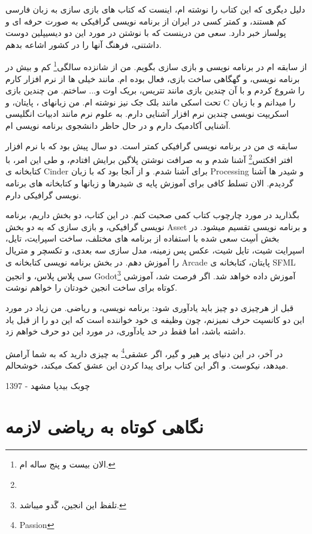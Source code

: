 \documentclass[14pt,a4paper]{memoir}
\begin{document}
	دلیل دیگری که این کتاب را نوشته ام، اینست که کتاب های بازی سازی به زبان فارسی کم هستند، و کمتر کسی در ایران از برنامه نویسی گرافیکی به صورت حرفه ای و پولساز خبر دارد. سعی من درینست که با نوشتن در مورد این دو دیسیپلین دوست داشتنی، فرهنگ آنها را در کشور اشاعه بدهم.
	
	از سابقه ام در برنامه نویسی و بازی سازی بگویم. من از شانزده سالگی\footnote{الان بیست و پنج ساله ام.} کم و بیش در برنامه نویسی، و گهگاهی ساخت بازی، فعال بوده ام. مانند خیلی ها از نرم افزار  کارم را شروع کردم و با آن چندین بازی مانند تتریس، بریک اوت و... ساختم. من چندین بازی تحت اسکی مانند بلک جک نیز نوشته ام. من زبانهای ، پایتان، و C را میدانم و با زبان اسکریپت نویسی چندین نرم افزار آشنایی دارم. به علوم نرم مانند ادبیات انگلیسی آشنایی آکادمیک دارم و در حال حاظر دانشجوی برنامه نویسی ام.
	
	سابقه ی من در برنامه نویسی گرافیکی کمتر است. دو سال پیش بود که با نرم افزار افتر افکتس\footnote{} آشنا شدم و به صرافت نوشتن پلاگین برایش افتادم، و طی این امر، با کتابخانه ی Cinder برای  آشنا شدم. و از آنجا بود که با زبان Processing و شیدر ها آشنا گردیدم. الان تسلط کافی برای آموزش پایه ی شیدرها و زبانها و کتابخانه های برنامه نویسی گرافیکی دارم.
	
	بگذارید در مورد چارچوب کتاب کمی صحبت کنم. در این کتاب، دو بخش داریم، برنامه نویسی گرافیکی، و بازی سازی که به دو بخش Asset و برنامه نویسی تقسیم میشود. در بخش اَسِت سعی شده با استفاده از برنامه های مختلف، ساخت اسپرایت، تایل، اسپرایت شیت، تایل شیت، عکس پس زمینه، مدل سازی سه بعدی، و تکسچر و متریال  را آموزش دهم. در بخش برنامه نویسی کتابخانه ی Arcade پایتان، کتابخانه ی SFML سی پلاس پلاس، و انجین Godot\footnote{تلفظ این انجین، گَدو میباشد.} آموزش داده خواهد شد. اگر فرصت شد، آموزشی کوتاه برای ساخت انجین خودتان را خواهم نوشت.
	
	قبل از هرچیزی دو چیز باید یادآوری شود: برنامه نویسی، و ریاضی. من زیاد در مورد این دو کانسپت حرف نمیزنم، چون وظیفه ی خود خواننده است که این دو را از قبل یاد داشته باشد، اما فقط در حد یادآوری، در مورد این دو حرف خواهم زد.
	 
		 در آخر، در این دنیای پر هیر و گیر، اگر عشقی\footnote{Passion} به چیزی دارید که به شما آرامش میدهد، نیکوست. و اگر این کتاب برای پیدا کردن این عشق کمک میکند، خوشحالم.
	 
	 \begin{flushleft}
	 	چوبک بیدپا
	 	مشهد - 1397
	 \end{flushleft}
	 
	 
	 
	 \chapter{نگاهی کوتاه به ریاضی لازمه}\label{math}
\end{document}
